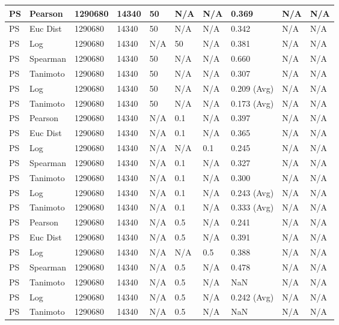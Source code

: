 \documentclass{article}
\begin{document}
\begin{longtable}{ |p{1.7cm}|p{1.9cm}|p{1.5cm}|p{1.5cm}|p{0.75cm}|p{0.75cm}|p{0.75cm}|p{0.75cm}|p{1.5cm}|p{1.5cm}|}
    PS & Pearson & 1290680 & 14340 & 50 & N/A & N/A & 0.369 & N/A & N/A  \\ \hline
    PS & Euc Dist & 1290680 & 14340 & 50 & N/A & N/A & 0.342 & N/A & N/A   \\ \hline
    PS & Log & 1290680 & 14340 & N/A &  50 & N/A& 0.381 & N/A & N/A  \\ \hline
    PS & Spearman & 1290680 & 14340 & 50 & N/A & N/A & 0.660 & N/A & N/A \\ \hline
    PS & Tanimoto & 1290680 & 14340 & 50 & N/A& N/A & 0.307 & N/A & N/A \\ \hline
    PS  & Log & 1290680 & 14340 & 50 & N/A& N/A & 0.209 (Avg) & N/A & N/A \\ \hline
    PS & Tanimoto & 1290680 & 14340 & 50 & N/A & N/A & 0.173 (Avg) & N/A & N/A \\ \hline
    
    PS & Pearson & 1290680 & 14340 & N/A & 0.1 & N/A & 0.397 & N/A & N/A  \\ \hline
    PS & Euc Dist & 1290680 & 14340 & N/A & 0.1 & N/A & 0.365 & N/A & N/A   \\ \hline
    PS & Log & 1290680 & 14340 & N/A &  N/A & 0.1 & 0.245 & N/A & N/A  \\ \hline
    PS  & Spearman & 1290680 & 14340 & N/A & 0.1 & N/A & 0.327 & N/A & N/A \\ \hline
    PS  & Tanimoto & 1290680 & 14340 & N/A & 0.1 & N/A & 0.300 & N/A & N/A \\ \hline
    PS  & Log & 1290680 & 14340 & N/A & 0.1 & N/A & 0.243 (Avg) & N/A & N/A \\ \hline
    PS  & Tanimoto & 1290680 & 14340 & N/A & 0.1 & N/A & 0.333 (Avg) & N/A & N/A \\ \hline
    
    PS & Pearson & 1290680 & 14340 & N/A & 0.5 & N/A & 0.241 & N/A & N/A  \\ \hline
    PS & Euc Dist & 1290680 & 14340 & N/A & 0.5 & N/A & 0.391 & N/A & N/A   \\ \hline
    PS & Log & 1290680 & 14340 & N/A &  N/A & 0.5 & 0.388 & N/A & N/A  \\ \hline
    PS & Spearman & 1290680 & 14340 & N/A & 0.5 & N/A & 0.478 & N/A & N/A \\ \hline
    PS & Tanimoto & 1290680 & 14340 & N/A & 0.5 & N/A & NaN & N/A & N/A \\ \hline
    PS & Log & 1290680 & 14340 & N/A & 0.5 & N/A & 0.242 (Avg) & N/A & N/A \\ \hline
    PS & Tanimoto & 1290680 & 14340 & N/A & 0.5 & N/A & NaN & N/A & N/A \\ \hline
    

\end{longtable}
\end{document}
